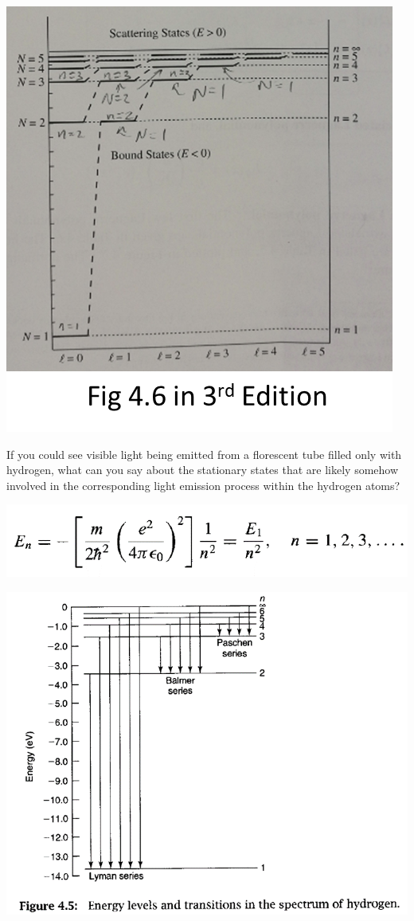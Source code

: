 \documentclass{article}
\begin{document}
\includegraphics[width = 0.7 \textwidth]{Lecture21/6.png}

If you could see visible light being emitted from a florescent tube filled only with hydrogen, what can you say about the stationary states that are likely somehow involved in the corresponding light emission process within the hydrogen atoms?

\includegraphics[width = 0.6 \textwidth]{Lecture21/7.png}

\includegraphics[width = 0.94 \textwidth]{Lecture21/8.png}
\end{document}

